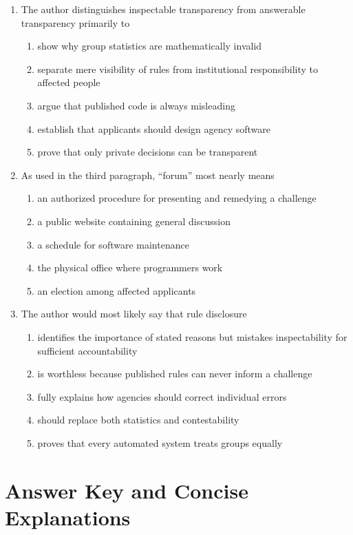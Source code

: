 \begin{enumerate}
\item The author distinguishes inspectable transparency from answerable transparency primarily to
\begin{enumerate}
\item show why group statistics are mathematically invalid
\item separate mere visibility of rules from institutional responsibility to affected people
\item argue that published code is always misleading
\item establish that applicants should design agency software
\item prove that only private decisions can be transparent
\end{enumerate}

\item As used in the third paragraph, ``forum'' most nearly means
\begin{enumerate}
\item an authorized procedure for presenting and remedying a challenge
\item a public website containing general discussion
\item a schedule for software maintenance
\item the physical office where programmers work
\item an election among affected applicants
\end{enumerate}

\item The author would most likely say that rule disclosure
\begin{enumerate}
\item identifies the importance of stated reasons but mistakes inspectability for sufficient accountability
\item is worthless because published rules can never inform a challenge
\item fully explains how agencies should correct individual errors
\item should replace both statistics and contestability
\item proves that every automated system treats groups equally
\end{enumerate}
\end{enumerate}

\newpage
\section*{Answer Key and Concise Explanations}

